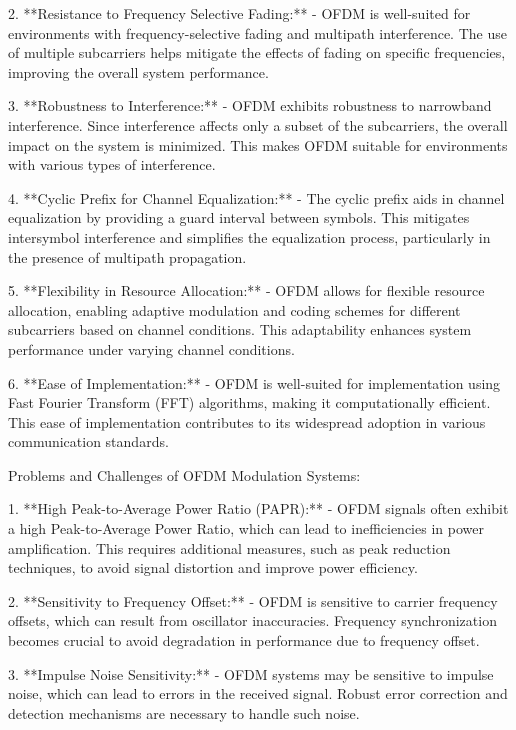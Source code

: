 \documentclass[colorlinks,11pt,a4paper,normalphoto,withhyper,ragged2e]{altareport}
\begin{document}
				2. **Resistance to Frequency Selective Fading:**
				- OFDM is well-suited for environments with frequency-selective fading and multipath interference. The use of multiple subcarriers helps mitigate the effects of fading on specific frequencies, improving the overall system performance.
				
				3. **Robustness to Interference:**
				- OFDM exhibits robustness to narrowband interference. Since interference affects only a subset of the subcarriers, the overall impact on the system is minimized. This makes OFDM suitable for environments with various types of interference.
				
				4. **Cyclic Prefix for Channel Equalization:**
				- The cyclic prefix aids in channel equalization by providing a guard interval between symbols. This mitigates intersymbol interference and simplifies the equalization process, particularly in the presence of multipath propagation.
				
				5. **Flexibility in Resource Allocation:**
				- OFDM allows for flexible resource allocation, enabling adaptive modulation and coding schemes for different subcarriers based on channel conditions. This adaptability enhances system performance under varying channel conditions.
				
				6. **Ease of Implementation:**
				- OFDM is well-suited for implementation using Fast Fourier Transform (FFT) algorithms, making it computationally efficient. This ease of implementation contributes to its widespread adoption in various communication standards.
				
				Problems and Challenges of OFDM Modulation Systems:
				
				1. **High Peak-to-Average Power Ratio (PAPR):**
				- OFDM signals often exhibit a high Peak-to-Average Power Ratio, which can lead to inefficiencies in power amplification. This requires additional measures, such as peak reduction techniques, to avoid signal distortion and improve power efficiency.
				
				2. **Sensitivity to Frequency Offset:**
				- OFDM is sensitive to carrier frequency offsets, which can result from oscillator inaccuracies. Frequency synchronization becomes crucial to avoid degradation in performance due to frequency offset.
				
				3. **Impulse Noise Sensitivity:**
				- OFDM systems may be sensitive to impulse noise, which can lead to errors in the received signal. Robust error correction and detection mechanisms are necessary to handle such noise.
				
\end{document}
